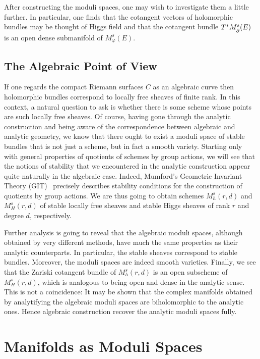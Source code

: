 \documentclass[12pt]{ociamthesis}  %
\begin{document}
After constructing the moduli spaces, one may wish to investigate
them a little further. In particular, one finds that the cotangent
vectors of holomorphic bundles may be thought of Higgs field and that
the cotangent bundle $T^* M^s_{\bar{\partial}}(E)$ is an open dense submanifold
of $M^s_\varphi(E)$.

\section{The Algebraic Point of View}

If one regards the compact Riemann surfaces $C$ as an algebraic curve
then holomorphic bundles correspond to locally free sheaves of finite
rank. In this context, a natural question to ask is whether there is
some scheme whose points are such locally free sheaves. Of course,
having gone through the analytic construction and being aware of
the correspondence between algebraic and analytic geometry, we know
that there ought to exist a moduli space of stable bundles that is not
just a scheme, but in fact a smooth variety. Starting only with
general properties of quotients of schemes by group actions, we will
see that the notions of stability that we encountered in the analytic
construction appear quite naturally in the algebraic case. Indeed,
Mumford's Geometric Invariant Theory (GIT)~\cite{mumford1994}
precisely describes stability conditions for the construction of quotients
by group actions.
We are thus going to obtain schemes $M^s_h(r,d)$ and $M^s_H(r,d)$
of stable locally free sheaves and stable Higgs sheaves of rank $r$ and
degree $d$, respectively.

Further analysis is going to reveal that the algebraic moduli spaces,
although obtained by very different methods, have much the same
properties as their analytic counterparts. In particular, the stable
sheaves correspond to stable bundles. Moreover, the moduli spaces
are indeed smooth varieties. Finally, we see that the Zariski cotangent
bundle of $M^s_h(r,d)$ is an open subscheme of $M^s_H(r,d)$, which
is analogous to being open and dense in the analytic sense. This is
not a coincidence: It may be shown that the complex manifolds obtained
by analytifying the algebraic moduli spaces are biholomorphic to
the analytic ones. Hence algebraic construction recover the analytic
moduli spaces fully.

\chapter{Manifolds as Moduli Spaces}
\end{document}
